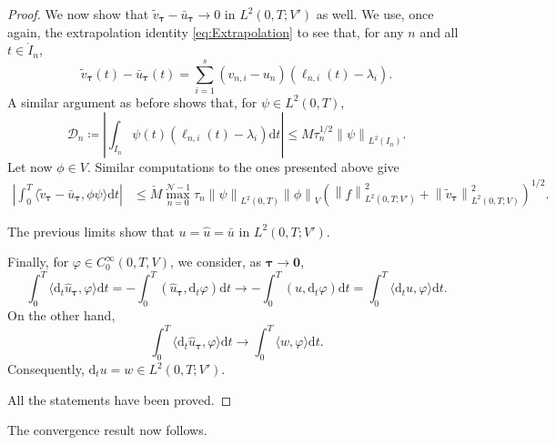 \documentclass{amsart}
\newcommand{\nrm}[1]{\left\| #1 \right\|}
\newcommand{\bftau}{{\boldsymbol{\tau}}}
\newcommand{\mclN}{\mathcal{N}}
\newcommand{\mclD}{\mathcal{D}}
\newcommand{\bfzero}{\mathbf{0}}
\theoremstyle{definition}
\newcommand{\diff}{\mathrm{d}}
\begin{document}
\begin{proof}
  We now show that $\tilde{v}_\bftau - \bar{u}_\bftau \to 0$ in $L^2(0,T;V')$ as well. We use, once again, the extrapolation identity \eqref{eq:Extrapolation} to see that, for any $n$ and all $t \in \mathring{I}_n$,
  \[
    \tilde{v}_\bftau(t) - \bar{u}_\bftau(t) = \sum_{i=1}^s (v_{n,i} - u_n) (\ell_{n,i}(t) - \lambda_i).
  \]
  A similar argument as before shows that, for $\psi \in L^2(0,T)$,
  \[
    \mclD_n \coloneqq \left| \int_{I_n} \psi(t) (\ell_{n,i}(t) - \lambda_i) \diff t \right| \leq M \tau_n^{1/2} \nrm{\psi}_{L^2(I_n)}.
  \]
  Let now $\phi \in V$. Similar computations to the ones presented above give
  \begin{align*}
    \left|\int_0^T \langle \tilde{v}_\bftau - \bar{u}_\bftau, \phi \psi \rangle \diff t \right| &\leq \check{M} \max_{n=0}^{\mclN-1} \tau_n \nrm{\psi}_{L^2(0,T)} \nrm{\phi}_V \left( \nrm{f}_{L^2(0,T;V')}^2 + \nrm{ \tilde{v}_\bftau }_{L^2(0,T;V)}^2 \right)^{1/2}.
  \end{align*}

  The previous limits show that $u = \hat{u} = \bar{u}$ in $L^2(0,T;V')$.

  Finally, for $\varphi \in C_0^\infty(0,T,V)$, we consider, as $\bftau \to \bfzero$,
  \[
    \int_0^T \langle \diff_t \hat{u}_\bftau, \varphi \rangle \diff t = -\int_0^T ( \hat{u}_\bftau, \diff_t \varphi ) \diff t \to -\int_0^T ( u, \diff_t \varphi ) \diff t = \int_0^T \langle \diff_t u, \varphi \rangle \diff t.
  \]
  On the other hand,
  \[
    \int_0^T \langle \diff_t \hat{u}_\bftau, \varphi \rangle \diff t \to \int_0^T \langle w, \varphi \rangle \diff t.
  \]
  Consequently, $\diff_t u = w \in L^2(0,T;V')$.

  All the statements have been proved.
\end{proof}

The convergence result now follows.
\end{document}
